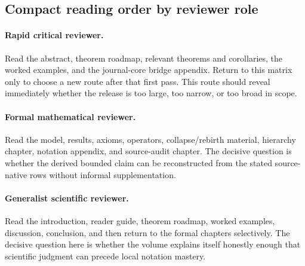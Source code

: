 \endgroup

\subsection{Compact reading order by reviewer role}

\paragraph{Rapid critical reviewer.}
Read the abstract, theorem roadmap, relevant theorems and corollaries, the worked examples,
and the journal-core bridge appendix. Return to this matrix only to choose a
new route after that first pass. This route should reveal immediately
whether the release is too large, too narrow, or too broad in scope.

\paragraph{Formal mathematical reviewer.}
Read the model, results, axioms, operators, collapse/rebirth material, hierarchy chapter,
notation appendix, and source-audit chapter. The decisive question is whether the derived bounded
claim can be reconstructed from the stated source-native rows without informal supplementation.

\paragraph{Generalist scientific reviewer.}
Read the introduction, reader guide, theorem roadmap, worked examples, discussion, conclusion,
and then return to the formal chapters selectively. The decisive question here is whether the
volume explains itself honestly enough that scientific judgment can precede local notation
mastery.

\clearpage
